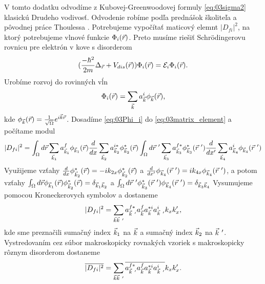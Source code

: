 V tomto dodatku odvodíme z Kubovej-Greenwoodovej formuly \eqref{eq:03sigma2} klasickú Drudeho vodivosť.
 Odvodenie robíme podľa prednášok školiteľa a pôvodnej práce  Thoulessa \cite{Thouless}.
 Potrebujeme vypočítať maticový elemnt $|D_{fi}|^2$, na ktorý  potrebujeme vlnové funkcie $\Phi_i(\vec{r})$.
 Preto musíme riešiť Schr\"odingerovu rovnicu pre elektrón v kove s disorderom
\begin{align}
\label{eq:03SchrDis}
(\frac{-\hbar^2}{2m}\Delta_{\vec{r}} + V_{dis}(\vec{r}))\Phi_i(\vec{r})=\mathcal{E}_i\Phi_i(\vec{r})  \text{.}
\end{align}
Urobíme rozvoj do rovinných vĺn
\begin{equation}
\label{eq:03Phi_i}
\Phi_i(\vec{r})=\sum_{\vec{k}}a^i_{\vec{k}}\phi_{\vec{k}}(\vec{r})\text{,}
\end{equation}
kde $\phi_{\vec{k}}(\vec{r})=\frac{1}{\sqrt \Omega}e^{i\vec{k}\vec{r}}$.
Dosadíme \eqref{eq:03Phi_i} do \eqref{eq:03matrix_element} a počítame modul
\begin{align}
\label{eq:03dfisquared}
|D_{fi}|^2=\int_\Omega d\vr \sum_{\vk_1}a_{\vk_1}^f\phi_{\vk_1}(\vr)\frac{d}{dx}\sum_{\vk_2}a_{\vk_2}^{i*}\phi_{\vk_2}^*(\vr)\int_\Omega d\vr\ ' \sum_{\vk_3}a_{\vk_3}^{f*}\phi_{\vk_3}^*(\vr\ ')\frac{d}{dx'}\sum_{\vk_4}a_{\vk_4}^i \phi_{\vk_4}(\vr\ ')
\end{align}
Využijeme vzťahy $\frac{d}{dx}\phi^{\ast}_{\vec{k}_2}(\vec{r})=-ik_{2x}\phi^{\ast}_{\vec{k}_2}(\vec{r})$ a $\frac{d}{dx'}\phi_{\vk_4}(\vr\ ')=ik_{4x}\phi_{\vk_4}(\vr\ ')$, a potom vzťahy
$\int_\Omega d\vec{r} \phi_{\vec{k}_1}(\vec{r})\phi^*_{\vec{k}_2}(\vec{r})=\delta_{\vec{k}_1\vec{k}_2}$ a $\int_\Omega d\vr\ '\phi_{\vk_3}^*(\vr\ ')\phi_{\vk_4}(\vr\ ')=\delta_{\vk_3\vk_4}$
Vysumujeme pomocou Kroneckerovych symbolov a dostaneme
\begin{align}
|D_{fi}|^2=\sum_{\vk\vk\ '} a^{f*}_{\vk\ '}a^f_{\vk}a^{*i}_{\vk}a^i_{\vk\ '}k_xk_x' \text{,}
\end{align}
kde sme preznačili sumačný index $\vec{k}_1$ na $\vec{k}$ a sumačný index  $\vec{k}_2$ na $\vk\ '$.
Vystredovaním cez súbor makroskopicky rovnakých vzoriek s makroskopicky rôznym disorderom dostaneme
\begin{align}
\label{eq:03dfisq2}
\overline{|D_{fi}|^2}=\sum_{\vk\vk\ '}\overline{a^{f*}_{\vk\ '}a^f_{\vk}a^{*i}_{\vk}a^i_{\vk\ '}}k_xk_x' \text{.}
\end{align}

